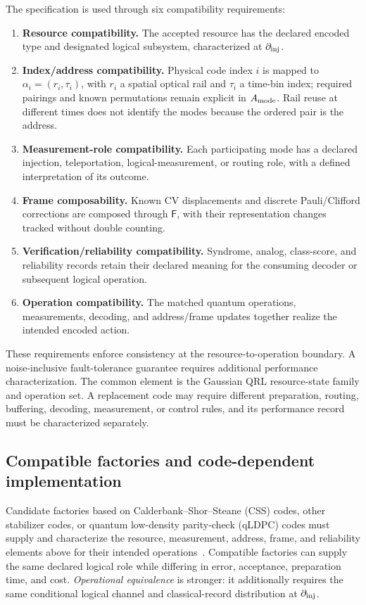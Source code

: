 \documentclass[aps,
prx,
superscriptaddress,
reprint,
longbibliography,
floatfix]{revtex4-2}
\begin{document}
The specification is used through six compatibility requirements:
\begin{enumerate}[label=(\roman*),leftmargin=2em,itemsep=2pt,topsep=4pt]
\item \textbf{Resource compatibility.} The accepted resource has the declared encoded type and designated logical subsystem, characterized at $\partial_{\rm inj}$.
\item \textbf{Index/address compatibility.} Physical code index $i$ is mapped to $\alpha_i=(r_i,\tau_i)$, with $r_i$ a spatial optical rail and $\tau_i$ a time-bin index; required pairings and known permutations remain explicit in $A_{\rm mode}$. Rail reuse at different times does not identify the modes because the ordered pair is the address.
\item \textbf{Measurement-role compatibility.} Each participating mode has a declared injection, teleportation, logical-measurement, or routing role, with a defined interpretation of its outcome.
\item \textbf{Frame composability.} Known CV displacements and discrete Pauli/Clifford corrections are composed through $\mathsf F$, with their representation changes tracked without double counting.
\item \textbf{Verification/reliability compatibility.} Syndrome, analog, class-score, and reliability records retain their declared meaning for the consuming decoder or subsequent logical operation.
\item \textbf{Operation compatibility.} The matched quantum operations, measurements, decoding, and address/frame updates together realize the intended encoded action.
\end{enumerate}
These requirements enforce consistency at the resource-to-operation boundary. A noise-inclusive fault-tolerance guarantee requires additional performance characterization. The common element is the Gaussian QRL resource-state family and operation set. A replacement code may require different preparation, routing, buffering, decoding, measurement, or control rules, and its performance record must be characterized separately.

\subsection{Compatible factories and code-dependent implementation}
Candidate factories based on Calderbank--Shor--Steane (CSS) codes, other stabilizer codes, or quantum low-density parity-check (qLDPC) codes must supply and characterize the resource, measurement, address, frame, and reliability elements above for their intended operations~\cite{Raveendran2022QLDPCGKP,Walshe2025ArbitraryCodes}. Compatible factories can supply the same declared logical role while differing in error, acceptance, preparation time, and cost. \emph{Operational equivalence} is stronger: it additionally requires the same conditional logical channel and classical-record distribution at $\partial_{\rm inj}$.
\end{document}
